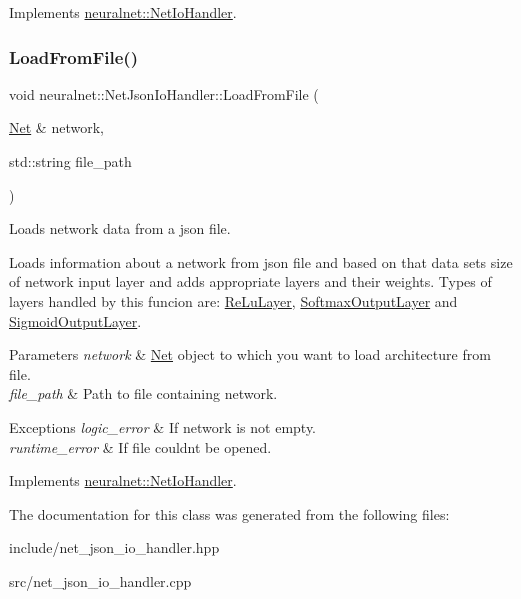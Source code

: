 Implements \hyperlink{classneuralnet_1_1NetIoHandler_a580e3b0768346da97ad40464cb62fe5c}{neuralnet\+::\+Net\+Io\+Handler}.

\mbox{\label{classneuralnet_1_1NetJsonIoHandler_af048bd4061be6b8e78d79b54680d9434}} 
\subsubsection{\texorpdfstring{Load\+From\+File()}{LoadFromFile()}}
{\footnotesize\ttfamily void neuralnet\+::\+Net\+Json\+Io\+Handler\+::\+Load\+From\+File (\begin{DoxyParamCaption}\item[{\hyperlink{classneuralnet_1_1Net}{Net} \&}]{network,  }\item[{std\+::string}]{file\+\_\+path }\end{DoxyParamCaption})\hspace{0.3cm}{\ttfamily [virtual]}}



Loads network data from a json file. 

Loads information about a network from json file and based on that data sets size of network input layer and adds appropriate layers and their weights. Types of layers handled by this funcion are\+: \hyperlink{classneuralnet_1_1ReLuLayer}{Re\+Lu\+Layer}, \hyperlink{classneuralnet_1_1SoftmaxOutputLayer}{Softmax\+Output\+Layer} and \hyperlink{classneuralnet_1_1SigmoidOutputLayer}{Sigmoid\+Output\+Layer}.


\begin{DoxyParams}{Parameters}
{\em network} & \hyperlink{classneuralnet_1_1Net}{Net} object to which you want to load architecture from file. \\
\hline
{\em file\+\_\+path} & Path to file containing network. \\
\hline
\end{DoxyParams}

\begin{DoxyExceptions}{Exceptions}
{\em logic\+\_\+error} & If network is not empty. \\
\hline
{\em runtime\+\_\+error} & If file couldn\textquotesingle{}t be opened. \\
\hline
\end{DoxyExceptions}


Implements \hyperlink{classneuralnet_1_1NetIoHandler_a9c6c5be1288e314c2affac7c939c52b5}{neuralnet\+::\+Net\+Io\+Handler}.



The documentation for this class was generated from the following files\+:\begin{DoxyCompactItemize}
\item 
include/net\+\_\+json\+\_\+io\+\_\+handler.\+hpp\item 
src/net\+\_\+json\+\_\+io\+\_\+handler.\+cpp\end{DoxyCompactItemize}
